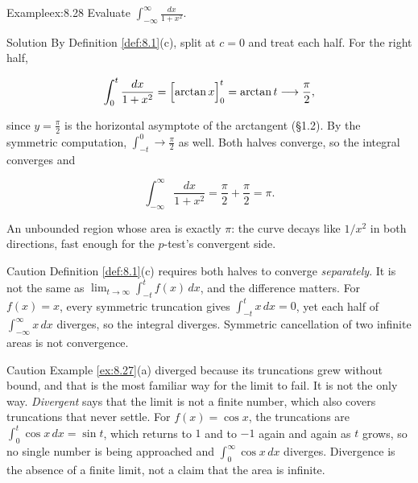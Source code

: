 \documentclass[a4paper,12pt,oneside]{memoir}
\begin{document}
\begin{workedexample}
\begin{envexample}{Example}{ex:8.28}{}
Evaluate \(\displaystyle\int_{-\infty}^{\infty} \frac{dx}{1 + x^{2}}\).
\end{envexample}
\begin{envsolution}{Solution}{}{}
By Definition \ref{def:8.1}(c), split at \(c = 0\) and treat each half. For the right half,

\[ \int_{0}^{t} \frac{dx}{1 + x^{2}} = \Bigl[\arctan x\Bigr]_{0}^{t} = \arctan t \longrightarrow \frac{\pi}{2}, \]

since \(y = \tfrac{\pi}{2}\) is the horizontal asymptote of the arctangent (§1.2). By the symmetric computation, \(\int_{-t}^{0} \to \tfrac{\pi}{2}\) as well. Both halves converge, so the integral converges and

\[ \int_{-\infty}^{\infty} \frac{dx}{1 + x^{2}} = \frac{\pi}{2} + \frac{\pi}{2} = \pi. \]

An unbounded region whose area is exactly \(\pi\): the curve decays like \(1/x^{2}\) in both directions, fast enough for the \(p\)-test’s convergent side. \qedmark
\end{envsolution}
\end{workedexample}
\begin{envcaution}{Caution}{}{}
Definition \ref{def:8.1}(c) requires both halves to converge \emph{separately}. It is not the same as \(\lim_{t \to \infty}\int_{-t}^{t} f(x)\,dx\), and the difference matters. For \(f(x) = x\), every symmetric truncation gives \(\int_{-t}^{t} x\,dx = 0\), yet each half of \(\int_{-\infty}^{\infty} x\,dx\) diverges, so the integral diverges. Symmetric cancellation of two infinite areas is not convergence.
\end{envcaution}
\begin{envcaution}{Caution}{}{}
Example \ref{ex:8.27}(a) diverged because its truncations grew without bound, and that is the most familiar way for the limit to fail. It is not the only way. \emph{Divergent} says that the limit is not a finite number, which also covers truncations that never settle. For \(f(x) = \cos x\), the truncations are \(\int_{0}^{t}\cos x\,dx = \sin t\), which returns to \(1\) and to \(-1\) again and again as \(t\) grows, so no single number is being approached and \(\int_{0}^{\infty}\cos x\,dx\) diverges. Divergence is the absence of a finite limit, not a claim that the area is infinite.
\end{envcaution}
\end{document}
